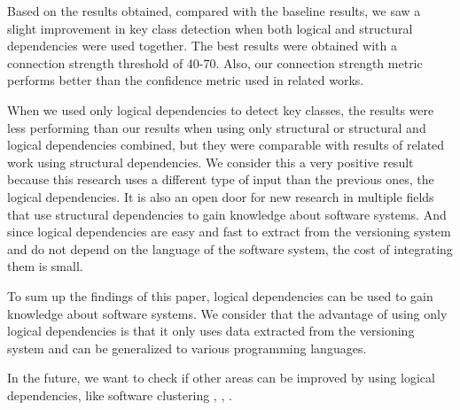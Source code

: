 \documentclass[runningheads]{comsis2}
\begin{document}
Based on the results obtained, compared with the baseline results, we saw a slight improvement in key class detection when both logical and structural dependencies were used together. The best results were obtained with a connection strength threshold of 40-70. Also, our connection strength metric performs better than the confidence metric used in related works.

When we used only logical dependencies to detect key classes, the results were less performing than our results when using only structural or structural and
logical dependencies combined, but they were comparable with results of related work using structural dependencies. We consider this a very
positive result because this research uses a different type of input than the previous ones, the logical dependencies.
It is also an open door for new research in multiple fields that use structural dependencies to gain knowledge about software systems. And since logical dependencies are easy and fast to extract from the versioning system and do not depend on the language of the software system, the cost of integrating them is small. 

To sum up the findings of this paper, logical dependencies can be used to gain knowledge about software systems. We consider that the advantage of using only logical dependencies is that it only uses data extracted from the versioning system and can be generalized to various programming languages.

In the future, we want to check if other areas can be improved by using logical dependencies, like software clustering \cite{SoraConti}, \cite{Shtern:2012:CMS:2332427.2332428}, \cite{SoraSem13}.






%
%

\end{document}
